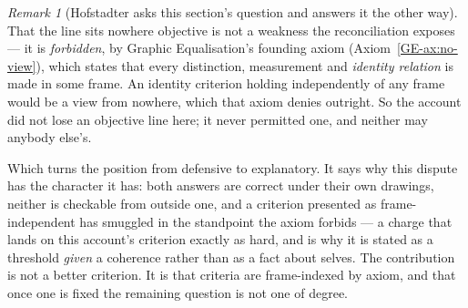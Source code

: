 \documentclass[11pt,a4paper]{article}
\theoremstyle{remark}\newtheorem{remark}[definition]{Remark}
\begin{document}
\begin{remark}[Hofstadter asks this section's question and answers it the other way]
That the line sits nowhere objective is not a weakness the reconciliation exposes --- it is
\emph{forbidden}, by Graphic Equalisation's founding axiom
(Axiom~\ref{GE-ax:no-view}), which states that every
distinction, measurement and \emph{identity relation} is made in some frame. An identity criterion
holding independently of any frame would be a view from nowhere, which that axiom denies outright. So
the account did not lose an objective line here; it never permitted one, and neither may anybody else's.

Which turns the position from defensive to explanatory. It says why this dispute has the character it
has: both answers are correct under their own drawings, neither is checkable from outside one, and a
criterion presented as frame-independent has smuggled in the standpoint the axiom forbids --- a charge
that lands on this account's criterion exactly as hard, and is why it is stated as a threshold
\emph{given} a coherence rather than as a fact about selves. The contribution is not a better criterion.
It is that criteria are frame-indexed by axiom, and that once one is fixed the remaining question is
not one of degree.
\end{remark}
\end{document}
